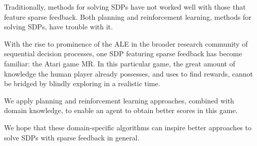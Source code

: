\newpage
\thispagestyle{empty}
\vfill
{}
Traditionally, methods for solving \acp{SDP} have not
worked well with those that feature sparse feedback. Both planning and
reinforcement learning, methods for solving \acp{SDP}, have trouble with it.

With the rise to prominence of the \ac{ALE} in the
broader research community of sequential decision processes, one \ac{SDP} featuring
sparse feedback has become familiar: the Atari game \acl{MR}. In this
particular game, the great amount of knowledge the human player already
possesses, and uses to find rewards, cannot be bridged by blindly exploring in a
realistic time.

We apply planning and reinforcement learning approaches, combined with domain
knowledge, to enable an agent to obtain better scores in this game.

We hope that these domain-specific algorithms can inspire better approaches to
solve \acp{SDP} with sparse feedback in general.
\vfill
